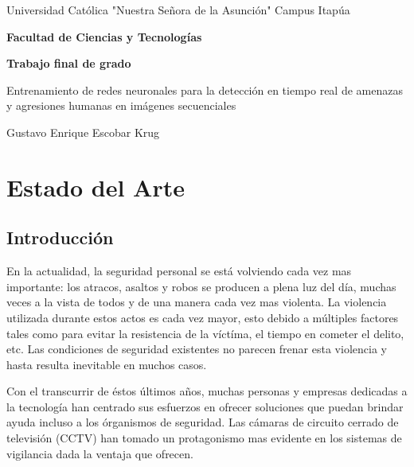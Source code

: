 \documentclass[a4paper,12pt,oneside,spanish]{book}
\begin{document}
	\begin{center}
		{\LARGE {Universidad Católica "Nuestra Señora de la Asunción" Campus Itapúa}}
	\end{center}
	\vspace*{0.1cm}
	\begin{center}
		{\large \rm \textbf {Facultad de Ciencias y Tecnologías}}
	\end{center}
	\vspace*{0.2cm}
	\begin{center}
		{\large \rm \textbf {Trabajo final de grado}}
	\end{center}		
	
	\baselineskip 30pt
	\vspace*{1cm}
	\begin{center}
		{\large \rm Entrenamiento de redes neuronales para la detección en tiempo real de amenazas y agresiones humanas en imágenes secuenciales}
	\end{center}

	\vspace*{1cm}

	\begin{center}
		{\sc  Gustavo Enrique Escobar Krug\\}
		\vspace*{0.1cm}
		
	\end{center}
	
	\pagebreak
	
	\baselineskip 16pt

	
\newpage
\setlength{\parskip}{1.3em}
\chapter{Estado del Arte}
\section{Introducción}
En la actualidad, la seguridad personal se está volviendo cada vez mas importante: los atracos, asaltos y robos se producen a plena luz del día, muchas veces a la vista de todos y de una manera cada vez mas violenta. La violencia utilizada durante estos actos es cada vez mayor, esto debido a múltiples factores tales como para evitar la resistencia de la víctíma, el tiempo en cometer el delito, etc. Las condiciones de seguridad existentes no parecen frenar esta violencia y hasta resulta inevitable en muchos casos. \par
Con el transcurrir de éstos últimos años, muchas personas y empresas dedicadas a la tecnología han centrado sus esfuerzos en ofrecer soluciones que puedan brindar ayuda incluso a los órganismos de seguridad. Las cámaras de circuito cerrado de televisión (CCTV) han tomado un protagonismo mas evidente en los sistemas de vigilancia dada la ventaja que ofrecen. \par
\end{document}
